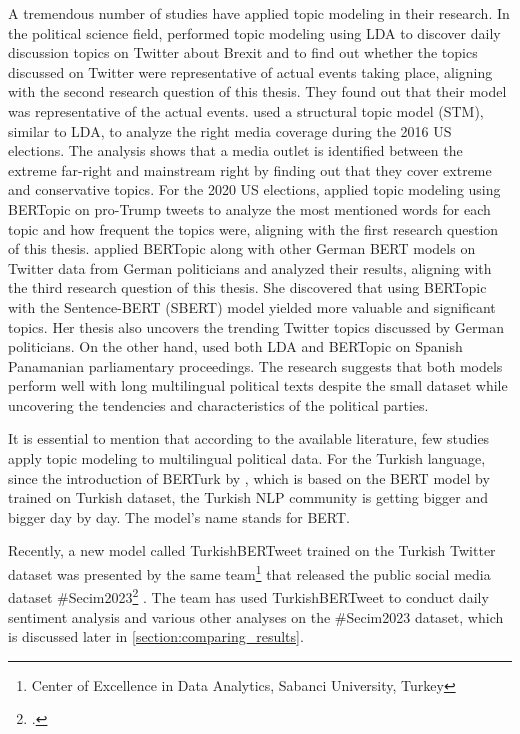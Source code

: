 A tremendous number of studies have applied topic modeling in their research. 
In the political science field, \textcite{ilyas_brexit_topic_modeling_2020} performed topic modeling 
using LDA to discover daily discussion topics on Twitter about Brexit and to find out whether 
the topics discussed on Twitter were representative of actual events taking place,
aligning with the second research question of this thesis.
They found out that their model was representative of the actual events.
\textcite{kaiser_right_media_USA_stm_topic_modeling_2020} used a structural topic model (STM), 
similar to LDA, to analyze the right media coverage during the 2016 US elections. 
The analysis shows that a media outlet is identified between the extreme far-right and 
mainstream right by finding out that they cover extreme and conservative topics.
For the 2020 US elections, \textcite{anwar_analyzing_twitter_BERT_QAnon_2021} applied 
topic modeling using BERTopic on pro-Trump tweets to analyze the most mentioned words for 
each topic and how frequent the topics were, aligning with the first research question of this thesis.
\textcite{bertopic_twitter_german_politics_2022} applied BERTopic along with other 
German BERT models on Twitter data from German politicians and analyzed their results,
aligning with the third research question of this thesis.
She discovered that using BERTopic with the Sentence-BERT (SBERT) model yielded more valuable and 
significant topics. Her thesis also uncovers the trending Twitter topics discussed by German politicians.
On the other hand, \textcite{contreras_panama_lda_bertopic_2022} used both LDA and BERTopic 
on Spanish Panamanian parliamentary proceedings. The research suggests that both 
models perform well with long multilingual political texts despite the small dataset
while uncovering the tendencies and characteristics of the political parties.

It is essential to mention that according to the available literature, few studies 
apply topic modeling to multilingual political data. For the Turkish language, 
since the introduction of BERTurk by \textcite{schweter_berturk_2020}, which is 
based on the BERT model by \textcite{devlin_bert_2019} trained on Turkish dataset,
the Turkish \ac{NLP} community is getting bigger and bigger day by day. 
The model's name stands for \ac{BERT}.

Recently, a new model called TurkishBERTweet trained on the Turkish Twitter dataset 
was presented by the same team\footnote{Center of Excellence in Data Analytics, Sabanci University, Turkey} 
that released the public social media dataset \#Secim2023\footcite{secim2023} \parencite{turkishbertweet_2023}. 
The team has used TurkishBERTweet to conduct daily sentiment analysis and 
various other analyses on the \#Secim2023 dataset, which is discussed later in \autoref{section:comparing_results}.

